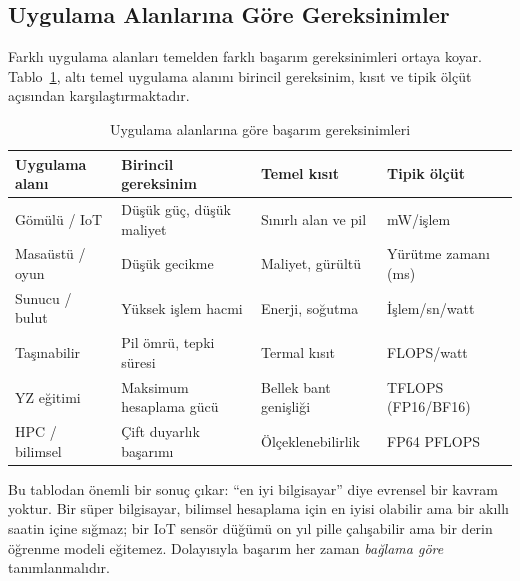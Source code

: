 \subsection{Uygulama Alanlarına Göre Gereksinimler}
\label{subsec:uygulama-gereksinimleri}

Farklı uygulama alanları temelden farklı başarım gereksinimleri ortaya koyar. Tablo~\ref{tab:gereksinim-matrisi}, altı temel uygulama alanını birincil gereksinim, kısıt ve tipik ölçüt açısından karşılaştırmaktadır.

\begin{table}[H]
\centering
\caption{Uygulama alanlarına göre başarım gereksinimleri}
\label{tab:gereksinim-matrisi}
\small
\begin{tabular}{lp{2.8cm}p{2.8cm}p{2.8cm}}
\toprule
\textbf{Uygulama alanı} & \textbf{Birincil gereksinim} & \textbf{Temel kısıt} & \textbf{Tipik ölçüt} \\
\midrule
Gömülü / IoT          & Düşük güç, düşük maliyet & Sınırlı alan ve pil & mW/işlem \\
Masaüstü / oyun       & Düşük gecikme            & Maliyet, gürültü     & Yürütme zamanı (ms) \\
Sunucu / bulut        & Yüksek işlem hacmi             & Enerji, soğutma      & İşlem/sn/watt \\
Taşınabilir           & Pil ömrü, tepki süresi   & Termal kısıt         & FLOPS/watt \\
YZ eğitimi            & Maksimum hesaplama gücü  & Bellek bant genişliği & TFLOPS (FP16/BF16) \\
HPC / bilimsel        & Çift duyarlık başarımı   & Ölçeklenebilirlik    & FP64 PFLOPS \\
\bottomrule
\end{tabular}
\end{table}

Bu tablodan önemli bir sonuç çıkar: ``en iyi bilgisayar'' diye evrensel bir kavram yoktur. Bir süper bilgisayar, bilimsel hesaplama için en iyisi olabilir ama bir akıllı saatin içine sığmaz; bir IoT sensör düğümü on yıl pille çalışabilir ama bir derin öğrenme modeli eğitemez. Dolayısıyla başarım her zaman \emph{bağlama göre} tanımlanmalıdır.


